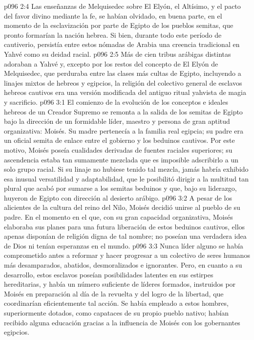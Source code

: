 \vs p096 2:4 \pc Las enseñanzas de Melquisedec sobre El Elyón, el Altísimo, y el pacto del favor divino mediante la fe, se habían olvidado, en buena parte, en el momento de la esclavización por parte de Egipto de los pueblos semitas, que pronto formarían la nación hebrea. Si bien, durante todo este período de cautiverio, persistía entre estos nómadas de Arabia una creencia tradicional en Yahvé como su deidad racial.
\vs p096 2:5 Más de cien tribus arábigas distintas adoraban a Yahvé y, excepto por los restos del concepto de El Elyón de Melquisedec, que perduraba entre las clases más cultas de Egipto, incluyendo a linajes mixtos de hebreos y egipcios, la religión del colectivo general de esclavos hebreos cautivos era una versión modificada del antiguo ritual yahvista de magia y sacrificio.
\vs p096 3:1 El comienzo de la evolución de los conceptos e ideales hebreos de un Creador Supremo se remonta a la salida de los semitas de Egipto bajo la dirección de un formidable líder, maestro y persona de gran aptitud organizativa: Moisés. Su madre pertenecía a la familia real egipcia; su padre era un oficial semita de enlace entre el gobierno y los beduinos cautivos. Por este motivo, Moisés poseía cualidades derivadas de fuentes raciales superiores; su ascendencia estaba tan sumamente mezclada que es imposible adscribirlo a un solo grupo racial. Si su linaje no hubiese tenido tal mezcla, jamás habría exhibido esa inusual versatilidad y adaptabilidad, que le posibilitó dirigir a la multitud tan plural que acabó por sumarse a los semitas beduinos y que, bajo su liderazgo, huyeron de Egipto con dirección al desierto arábigo.
\vs p096 3:2 A pesar de los alicientes de la cultura del reino del Nilo, Moisés decidió unirse al pueblo de su padre. En el momento en el que, con su gran capacidad organizativa, Moisés elaboraba sus planes para una futura liberación de estos beduinos cautivos, ellos apenas disponían de religión digna de tal nombre; no poseían una verdadera idea de Dios ni tenían esperanzas en el mundo.
\vs p096 3:3 \pc Nunca líder alguno se había comprometido antes a reformar y hacer progresar a un colectivo de seres humanos más desamparados, abatidos, desmoralizados e ignorantes. Pero, en cuanto a su desarrollo, estos esclavos poseían posibilidades latentes en sus estirpes hereditarias, y había un número suficiente de líderes formados, instruidos por Moisés en preparación al día de la revuelta y del logro de la libertad, que coordinarían eficientemente tal acción. Se había empleado a estos hombres, superiormente dotados, como capataces de su propio pueblo nativo; habían recibido alguna educación gracias a la influencia de Moisés con los gobernantes egipcios.
